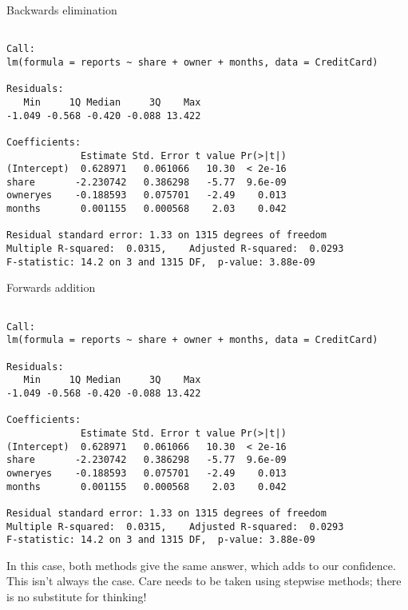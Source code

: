 \documentclass[10pt,ignorenonframetext,]{beamer}
\begin{document}
\begin{frame}[fragile]{Backwards elimination}

\begin{verbatim}

Call:
lm(formula = reports ~ share + owner + months, data = CreditCard)

Residuals:
   Min     1Q Median     3Q    Max
-1.049 -0.568 -0.420 -0.088 13.422

Coefficients:
             Estimate Std. Error t value Pr(>|t|)
(Intercept)  0.628971   0.061066   10.30  < 2e-16
share       -2.230742   0.386298   -5.77  9.6e-09
owneryes    -0.188593   0.075701   -2.49    0.013
months       0.001155   0.000568    2.03    0.042

Residual standard error: 1.33 on 1315 degrees of freedom
Multiple R-squared:  0.0315,    Adjusted R-squared:  0.0293
F-statistic: 14.2 on 3 and 1315 DF,  p-value: 3.88e-09
\end{verbatim}

\end{frame}

\begin{frame}[fragile]{Forwards addition}

\scriptsize

\begin{verbatim}

Call:
lm(formula = reports ~ share + owner + months, data = CreditCard)

Residuals:
   Min     1Q Median     3Q    Max
-1.049 -0.568 -0.420 -0.088 13.422

Coefficients:
             Estimate Std. Error t value Pr(>|t|)
(Intercept)  0.628971   0.061066   10.30  < 2e-16
share       -2.230742   0.386298   -5.77  9.6e-09
owneryes    -0.188593   0.075701   -2.49    0.013
months       0.001155   0.000568    2.03    0.042

Residual standard error: 1.33 on 1315 degrees of freedom
Multiple R-squared:  0.0315,    Adjusted R-squared:  0.0293
F-statistic: 14.2 on 3 and 1315 DF,  p-value: 3.88e-09
\end{verbatim}

\normalsize
In this case, both methods give the same answer, which adds to our
confidence. This isn't always the case. Care needs to be taken using
stepwise methods; there is no substitute for thinking!

\end{frame}
\end{document}
